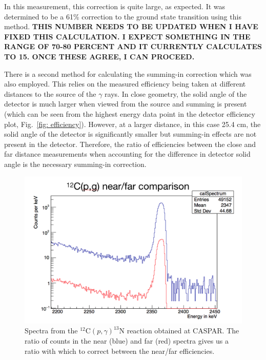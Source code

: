 \noindent In this measurement, this correction is quite large, as expected. It was determined to be a 61\% correction to the ground state transition using this method. \textbf{THIS NUMBER NEEDS TO BE UPDATED WHEN I HAVE FIXED THIS CALCULATION. I EXPECT SOMETHING IN THE RANGE OF 70-80 PERCENT AND IT CURRENTLY CALCULATES TO 15. ONCE THESE AGREE, I CAN PROCEED.}

There is a second method for calculating the summing-in correction which was also employed. This relies on the measured efficiency being taken at different distances to the source of the $\gamma$ rays. In close geometry, the solid angle of the detector is much larger when viewed from the source and summing is present (which can be seen from the highest energy data point in the detector efficiency plot, Fig.\ \ref{fig: efficiency}). However, at a larger distance, in this case 25.4 cm, the solid angle of the detector is significantly smaller but summing-in effects are not present in the detector. Therefore, the ratio of efficiencies between the close and far distance measurements when accounting for the difference in detector solid angle is the necessary summing-in correction. 


\begin{figure}
\centering
\includegraphics[width=\linewidth]{figures/carbonComparison.png}
\caption{Spectra from the $^{12}$C$\left( p,\gamma \right) ^{13}$N reaction obtained at CASPAR. The ratio of counts in the near (blue) and far (red) spectra gives us a ratio with which to correct between the near/far efficiencies. }
\label{fig: 12cpg}
\end{figure}

